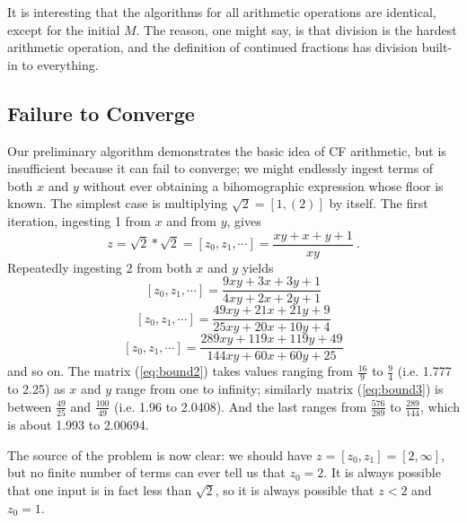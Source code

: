 \documentclass[11pt, oneside]{amsart}   	%
\newcommand{\bihom}[8]{{\frac{#1 xy + #2 x + #3 y + #4}{#5 xy + #6 x + #7 y + #8}}}
\renewcommand{\:}{\negthickspace:\negthickspace}
\begin{document}
It is interesting that the algorithms for all arithmetic operations are identical, except for the initial $M$. The reason, one might say, is
that division is the hardest arithmetic operation, and the definition of continued fractions has division built-in to everything.



\subsection{Failure to Converge}
Our preliminary algorithm demonstrates the basic idea of CF arithmetic, but is insufficient because it can fail to converge;
we might endlessly ingest terms of both $x$ and $y$ without ever obtaining a bihomographic expression whose floor is known. The
simplest case is multiplying $\sqrt{2} = [1,(2)]$ by itself. The first iteration, ingesting 1 from $x$ and from $y$, gives
\begin{equation*}
z = \sqrt{2}*\sqrt{2} = [z_0,z_1, \cdots] = \frac{xy+x+y+1}{xy} \ . %
\end{equation*}
Repeatedly ingesting 2 from both $x$ and $y$ yields
\begin{equation}\label{eq:bound2}
[z_0,z_1, \cdots]  =  \bihom{9}{3}{3}{1}{4}{2}{2}{1}
\end{equation}
\begin{equation}\label{eq:bound3}
[z_0,z_1, \cdots]  =  \bihom{49}{21}{21}{9}{25}{20}{10}{4}
\end{equation}
\begin{equation}\label{eq:bound4}
[z_0,z_1, \cdots]  =  \bihom{289}{119}{119}{49}{144}{60}{60}{25}
\end{equation}
and so on. The matrix (\ref{eq:bound2}) takes values ranging from $\frac{16}{9}$ to $\frac{9}{4}$ (i.e. 1.777 to 2.25)
as $x$ and $y$ range from one to infinity;
similarly matrix (\ref{eq:bound3}) is between $\frac{49}{25}$ and $\frac{100}{49}$ (i.e. 1.96 to 2.0408).
And the last ranges from $\frac{576}{289}$ to $\frac{289}{144}$, which is about 1.993 to 2.00694.

The source of the problem is now clear: we should have $z=[z_0,z_1]=[2,\infty]$, but no finite number of terms can ever tell us that
$z_0=2$. It is always possible that one input is in fact less than $\sqrt{2}$, so it is always possible that $z<2$ and $z_0=1$.
\end{document}
